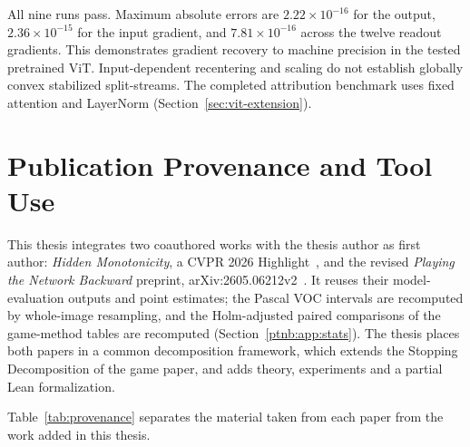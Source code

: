 All nine runs pass. Maximum absolute errors are $2.22\times10^{-16}$ for the output, $2.36\times10^{-15}$ for the input gradient, and $7.81\times10^{-16}$ across the twelve readout gradients. This demonstrates gradient recovery to machine precision in the tested pretrained ViT. Input-dependent recentering and scaling do not establish globally convex stabilized split-streams. The completed attribution benchmark uses fixed attention and LayerNorm (Section~\ref{sec:vit-extension}).



\chapter{Publication Provenance and Tool Use}\label{app:publication_provenance}

This thesis integrates two coauthored works with the thesis author as first author: \emph{Hidden Monotonicity}, a CVPR 2026 Highlight~\parencite{hiddenMono}, and the revised \emph{Playing the Network Backward} preprint, arXiv:2605.06212v2~\parencite{playingBackward2026}. It reuses their model-evaluation outputs and point estimates; the Pascal VOC intervals are recomputed by whole-image resampling, and the Holm-adjusted paired comparisons of the game-method tables are recomputed (Section~\ref{ptnb:app:stats}). The thesis places both papers in a common decomposition framework, which extends the Stopping Decomposition of the game paper, and adds theory, experiments and a partial Lean formalization.

Table~\ref{tab:provenance} separates the material taken from each paper from the work added in this thesis.

